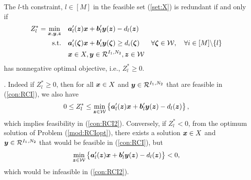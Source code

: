 \documentclass[fleqn,orsc,blindrev]{informs4}
\newcommand{\mb}[1]{\mbox{\boldmath \ensuremath{#1}}}
\newcommand{\mbs}[1]{\mb{\scriptstyle{#1}}}
\begin{document}
		\begin{theorem} \label{thm:RCIExact}
			The $l$-th constraint, $l \in [M]$  in the feasible set (\ref{set:X}) is redundant if and only if
\begin{equation} \label{mod:RCIopt}
				\begin{aligned} 
					Z^*_l=	\min_{ \boldsymbol{x}  , \boldsymbol{y}, \boldsymbol{z}} \quad & \mb{a}'_l(\mb{z})\mb{x}+\mb{b}'_l \mb{y}(\mb{z}) - d_l(\mb{z}) \\
					{\rm s.t.}  \quad &\mb{a}'_i(\mb{\zeta})\mb{x}+\mb{b}'_i \mb{y}(\mb{\zeta}) \geq d_i(\mb{\zeta}) &  \forall  \mb{\zeta} \in  \mathcal{W}, \quad \forall i  \in [M] \backslash \{l\} \\
					\quad & \boldsymbol{x} \in X, \boldsymbol{y} \in   \mathcal{R}^{I_1,N_2},  \mb{z} \in \mathcal{W}
				\end{aligned}
\end{equation}
			has nonnegative optimal objective, i.e.,  $Z^*_l\geq 0$. 
		\end{theorem}
		. 
		Indeed if  $Z^*_l\geq 0$, then for  all $\mb{x} \in X$ and $\mb{y}\in \mathcal{R}^{I_1,N_2}$ that are feasible in (\ref{con:RCI}), we also have
\begin{equation*}
		0 \le  Z^*_l  \le  \min_{\mbs{z} \in \mathcal{W}}  \left\{  \mb{a}'_l(\mb{z})\mb{x}+\mb{b}'_l \mb{y}(\mb{z}) - d_l(\mb{z})  \right\},
\end{equation*}
		which implies feasibility in (\ref{con:RCI2}). Conversely, if $Z^*_l <0$, from the optimum solution of  Problem (\ref{mod:RCIopt}), there exists  a solution  $\mb{x} \in X$ and $\mb{y} \in \mathcal{R}^{I_1,N_2}$ that would be feasible in (\ref{con:RCI}), but\vadjust{\pagebreak}
\begin{equation*}
		\min_{\mbs{z} \in \mathcal{W}} \left\{  \mb{a}'_l(\mb{z})\mb{x}+\mb{b}'_l \mb{y}(\mb{z}) - d_l(\mb{z}) \right\} < 0, 
\end{equation*}
		which would be infeasible in (\ref{con:RCI2}).
		 \hfill \Halmos\\
		
\end{document}
